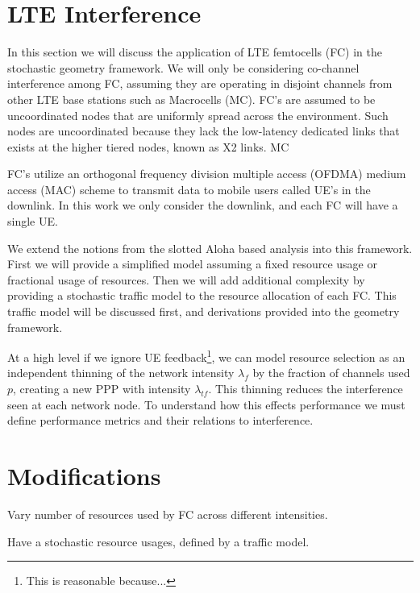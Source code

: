 \section{LTE Interference}
%
In this section we will discuss the application of LTE femtocells (FC) in the stochastic geometry framework.  We will only be considering co-channel interference among FC, assuming they are operating in disjoint channels from other LTE base stations such as Macrocells (MC).  FC's are assumed to be uncoordinated nodes that are uniformly spread across the environment.  Such nodes are uncoordinated because they lack the low-latency dedicated links that exists at the higher tiered nodes, known as X2 links.  MC
%
%
\par
%
FC's utilize an orthogonal frequency division multiple access (OFDMA) medium access (MAC) scheme to transmit data to mobile users called UE's in the downlink.  In this work we only consider the downlink, and each FC will have a single UE.
%
\par
%
We extend the notions from the slotted Aloha based analysis into this framework.  First we will provide a simplified model assuming a fixed resource usage or fractional usage of resources.  Then we will add additional complexity by providing a stochastic traffic model to the resource allocation of each FC.  This traffic model will be discussed first, and derivations provided into the geometry framework.
\par
%
At a high level if we ignore UE feedback\footnote{This is reasonable because...}, we can model resource selection as an independent thinning of the network intensity $\lambda_{f}$ by the fraction of channels used $p$, creating a new PPP with intensity $\lambda_{tf}$.  This thinning reduces the interference seen at each network node.  To understand how this effects performance we must define performance metrics and their relations to interference.\par
%
\section{Modifications}
%
Vary number of resources used by FC across different intensities.\par
%
Have a stochastic resource usages, defined by a traffic model.\par
%
